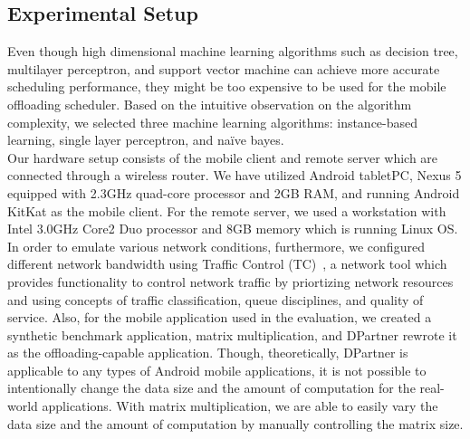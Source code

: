 \documentclass[10pt, conference, compsocconf]{IEEEtran}
\begin{document}
{\subsection{Experimental Setup}
%
Even though high dimensional machine learning algorithms such as
decision tree, multilayer perceptron, and support vector machine can
achieve more accurate scheduling performance, they might be too
expensive to be used for the mobile offloading scheduler.
%
Based on the intuitive observation on the algorithm complexity, we
selected three machine learning algorithms: instance-based learning,
single layer perceptron, and na\"{i}ve bayes.\\ 
%
\indent Our hardware setup consists of the mobile client and
remote server which are connected through a wireless router.
%
We have utilized Android tabletPC, Nexus 5 equipped with 2.3GHz
quad-core processor and 2GB RAM, and running Android KitKat as the
mobile client.
%
For the remote server, we used a workstation with Intel 3.0GHz Core2 Duo
processor and 8GB memory which is running Linux OS.
%
In order to emulate various network conditions, furthermore, we
configured different network bandwidth using Traffic Control
(TC)~\cite{tc}, a network tool which provides functionality to control
network traffic by priortizing network resources and using concepts of
traffic classification, queue disciplines, and quality of service.
%
Also, for the mobile application used in the evaluation, we created
a synthetic benchmark application, matrix multiplication, and DPartner
rewrote it as the offloading-capable application.
%
Though, theoretically, DPartner is applicable to any types of Android
mobile applications, it is not possible to intentionally change the data
size and the amount of computation for the real-world applications.
%
With matrix multiplication, we are able to easily vary the data size and
the amount of computation by manually controlling the matrix size.
%
}
\end{document}
